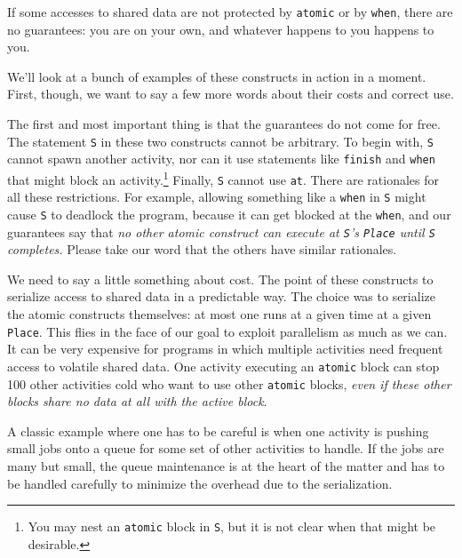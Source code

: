 If some accesses to shared data are not protected by {\tt atomic}
or by {\tt when},  there are no guarantees: you are on your own, and whatever
happens to you happens to you.

We'll look at a bunch of examples of these constructs in action in a moment.
First, though, we want to say a few more words about their costs and correct
use.

The first and most important thing is that the guarantees do not come for
free.  The statement {\tt S} in
these two constructs cannot be arbitrary.  To begin with, {\tt S} cannot spawn
another activity, nor can it use statements like {\tt finish} and {\tt when} 
that might block an activity.\footnote{
You may nest an {\tt atomic} block in {\tt S}, but it is not clear
when that might be desirable.
}
Finally, {\tt S} cannot use {\tt at}.  There are rationales for all these
restrictions.  For example, allowing something like a {\tt when} in
{\tt S} might cause {\tt S} to deadlock the program, because it can get
blocked at the {\tt when}, and our guarantees say that
{\em no other atomic construct can
execute at {\tt S}'s {\tt Place} until {\tt S} completes.}  Please take our word
that the others have similar rationales.

We need to say a little something about cost.  The point of these constructs
to serialize access to shared data in a predictable way.  The choice was
to serialize the atomic constructs themselves: at most one runs at a given
time at a given {\tt Place}.  This flies in the face of our goal to exploit
parallelism as much as we can.  It can be very expensive for programs
in which multiple activities need frequent access to volatile shared data.
One activity executing an {\tt atomic} block can stop 100
other activities cold who want to use other {\tt atomic} blocks, {\em even
if these other blocks share no data at all with the active block}.

A classic example where one has to be careful is
when one activity is pushing small jobs onto a queue for 
some set of other activities to handle.  If the jobs are many but small,
the queue maintenance is at
the heart of the matter and has to be handled carefully to minimize the
overhead due to the serialization.

